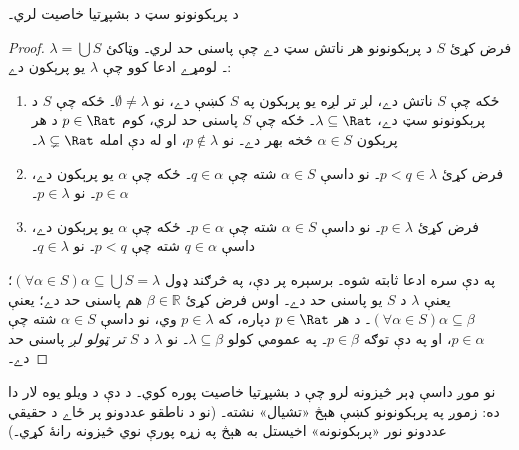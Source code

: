 \documentclass[../../../include/open-logic-section]{subfiles}
\begin{document}
\begin{thm}
د پرېکونونو سټ د بشپړتيا خاصيت لري۔
\end{thm}

\begin{proof}
فرض کړئ $S$ د پرېکونونو هر ناتش سټ دے چې پاسنی حد لري۔ وټاکئ
$\lambda = \bigcup S$۔
لومړے ادعا کوو چې $\lambda$ يو پرېکون دے:
\begin{enumerate}
\item ځکه چې $S$ ناتش دے، لږ تر لږه يو پرېکون په $S$ کښې دے، نو
$\emptyset \neq \lambda$۔ ځکه چې $S$ د پرېکونونو سټ
دے، $\lambda \subseteq \Rat$۔ ځکه چې $S$ پاسنی حد لري، کوم
$p \in \Rat$ د هر پرېکون $\alpha \in S$ څخه بهر دے۔ نو
$p\notin \lambda$، او له دې امله $\lambda \subsetneq \Rat$۔
\item فرض کړئ $p < q \in \lambda$۔ نو داسې $\alpha \in S$ شته
چې $q \in \alpha$۔ ځکه چې $\alpha$ يو پرېکون دے،
$p \in \alpha$۔ نو $p \in \lambda$۔
\item فرض کړئ $p \in \lambda$۔ نو داسې $\alpha \in S$ شته چې
$p \in \alpha$۔ ځکه چې $\alpha$ يو پرېکون دے، داسې $q \in
\alpha$ شته چې $p < q$۔ نو $q \in \lambda$۔
\end{enumerate}
په دې سره ادعا ثابته شوه۔ برسېره پر دې، په څرګند ډول
$(\forall \alpha \in S)\alpha \subseteq \bigcup S = \lambda$؛
يعنې $\lambda$ د $S$ يو پاسنی حد دے۔ اوس فرض کړئ
$\beta \in \mathbb{R}$ هم پاسنی حد دے؛ يعنې
$(\forall \alpha \in S)\alpha \subseteq \beta$۔ د هر
$p \in \Rat$ دپاره، که $p \in \lambda$ وي، نو داسې
$\alpha \in S$ شته چې $p \in \alpha$، او په دې توګه
$p \in \beta$۔ په عمومي کولو $\lambda \subseteq \beta$۔ نو
$\lambda$ د $S$ \emph{تر ټولو لږ} پاسنی حد دے۔
\end{proof}

نو موږ داسې ډېر څيزونه لرو چې د بشپړتيا خاصيت پوره کوي۔ د دې د
ويلو يوه لار دا ده: زموږ په پرېکونونو کښې هېڅ «تشيال» نشته۔
(نو د ناطقو عددونو پر ځاے د حقيقي عددونو نور «پرېکونونه» اخيستل
به هېڅ په زړه پورې نوي څيزونه رانۀ کړي۔)
\end{document}

